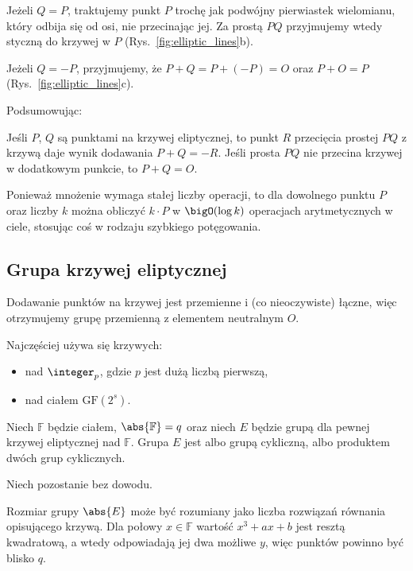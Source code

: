 Jeżeli \( Q = P \), traktujemy punkt \( P \) trochę jak podwójny pierwiastek wielomianu, który odbija się od osi, nie przecinając jej.
Za prostą \( PQ \) przyjmujemy wtedy styczną do krzywej w \( P \) (Rys.~\ref{fig:elliptic_lines}b).

Jeżeli \( Q = -P \), przyjmujemy, że \( P + Q = P + (-P) = O \) oraz \(P + O = P \) (Rys.~\ref{fig:elliptic_lines}c).

Podsumowując:
\begin{definition}[Dodawanie]
    Jeśli \( P \), \( Q \) są punktami na krzywej eliptycznej, to punkt \( R \) przecięcia prostej \( PQ \) z krzywą daje wynik dodawania \( P + Q = -R \).
    Jeśli prosta \( PQ \) nie przecina krzywej w dodatkowym punkcie, to \( P + Q = O \).
\end{definition}

Ponieważ mnożenie wymaga stałej liczby operacji, to dla dowolnego punktu \( P \) oraz liczby \( k \) można obliczyć \( k \cdot P \) w \( \bigO(\log k) \) operacjach arytmetycznych w ciele, stosując coś w rodzaju szybkiego potęgowania.

\subsection{Grupa krzywej eliptycznej}
Dodawanie punktów na krzywej jest przemienne i (co nieoczywiste) łączne, więc otrzymujemy grupę przemienną z elementem neutralnym \( O \).

Najczęściej używa się krzywych:
\begin{itemize}
    \item nad \( \integer_p \), gdzie \( p \) jest dużą liczbą pierwszą,
    \item nad ciałem \( \text{GF}(2^s) \).
\end{itemize}

\begin{theorem}
    Niech \( \mathbb{F} \) będzie ciałem, \( \abs{\mathbb{F}} = q \) oraz niech \( E \) będzie grupą dla pewnej krzywej eliptycznej nad \( \mathbb{F} \). Grupa \( E \) jest albo grupą cykliczną, albo produktem dwóch grup cyklicznych.
\end{theorem}
Niech pozostanie bez dowodu.

Rozmiar grupy \( \abs{E} \) może być rozumiany jako liczba rozwiązań równania opisującego krzywą.
Dla połowy \( x \in \mathbb{F} \) wartość \( x^3 + ax + b \) jest resztą kwadratową, a wtedy odpowiadają jej dwa możliwe \( y \), więc punktów powinno być blisko \( q \).